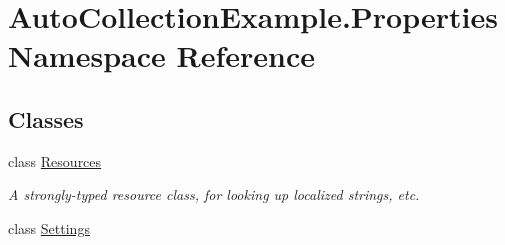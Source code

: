 \hypertarget{namespace_auto_collection_example_1_1_properties}{}\section{Auto\+Collection\+Example.\+Properties Namespace Reference}
\label{namespace_auto_collection_example_1_1_properties}
\subsection*{Classes}
\begin{DoxyCompactItemize}
\item 
class \mbox{\hyperlink{class_auto_collection_example_1_1_properties_1_1_resources}{Resources}}
\begin{DoxyCompactList}\small\item\em A strongly-\/typed resource class, for looking up localized strings, etc. \end{DoxyCompactList}\item 
class \mbox{\hyperlink{class_auto_collection_example_1_1_properties_1_1_settings}{Settings}}
\end{DoxyCompactItemize}
